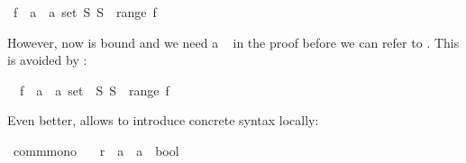 \begin{isabellebody}
\begin{isamarkuptext}
\end{isamarkuptext}%
\isamarkuptrue%
\isamarkupfalse%
\ {}{}f\ {}{}\ {}a\ {}\ {}a\ set{}\ {}S{}\ S\ {}\ range\ f{}%
\isadelimproof
%
\endisadelimproof
%
\isatagproof
%
\endisatagproof
{\isafoldproof}%
%
\isadelimproof
%
\endisadelimproof
%
\begin{isamarkuptext}%
\noindent However, now  is bound and we need a
~ in the proof before we can refer to .
This is avoided by :%
\end{isamarkuptext}%
\isamarkuptrue%
\isamarkupfalse%
\ \ f\ {}{}\ {}{}a\ {}\ {}a\ set{}\ \ {}{}S{}\ S\ {}\ range\ f{}%
\isadelimproof
%
\endisadelimproof
%
\isatagproof
%
\endisatagproof
{\isafoldproof}%
%
\isadelimproof
%
\endisadelimproof
%
\begin{isamarkuptext}%
\noindent
Even better,  allows to introduce concrete syntax locally:%
\end{isamarkuptext}%
\isamarkuptrue%
\isamarkupfalse%
\ comm{}mono{}\isanewline
\ \ \ r\ {}{}\ {}{}a\ {}\ {}a\ {}\ bool{}\ {}\ {}{}{}\ {}{}{}\ \isanewline

\end{isabellebody}

